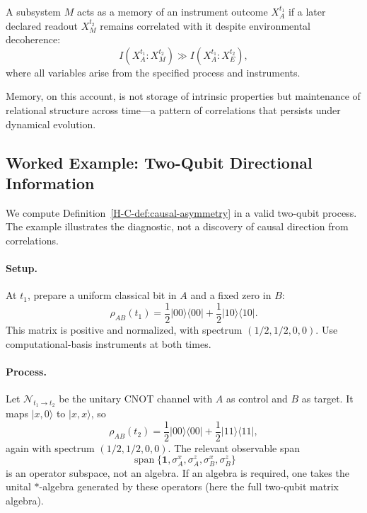 \documentclass[12pt,a4paper,openany]{book}
\begin{document}
A subsystem $M$ acts as a memory of an instrument outcome $X_A^{t_1}$ if a later declared readout $X_M^{t_2}$ remains correlated with it despite environmental decoherence:
\begin{equation}
I(X_A^{t_1}:X_M^{t_2})
\gg I(X_A^{t_1}:X_E^{t_2}),
\end{equation}
where all variables arise from the specified process and instruments.

Memory, on this account, is not storage of intrinsic properties but maintenance of relational structure across time—a pattern of correlations that persists under dynamical evolution.

\subsection{Worked Example: Two-Qubit Directional Information}
\label{H-C-sec:I.5example}

We compute Definition~\ref{H-C-def:causal-asymmetry} in a valid two-qubit process.  The example illustrates the diagnostic, not a discovery of causal direction from correlations.

\paragraph{Setup.}
At $t_1$, prepare a uniform classical bit in $A$ and a fixed zero in $B$:
\begin{equation}
\rho_{AB}(t_1)
=\frac12|00\rangle\langle00|
+\frac12|10\rangle\langle10|.
\end{equation}
This matrix is positive and normalized, with spectrum $(1/2,1/2,0,0)$.  Use computational-basis instruments at both times.

\paragraph{Process.}
Let $\mathcal N_{t_1\to t_2}$ be the unitary CNOT channel with $A$ as control and $B$ as target.  It maps $|x,0\rangle$ to $|x,x\rangle$, so
\begin{equation}
\rho_{AB}(t_2)
=\frac12|00\rangle\langle00|
+\frac12|11\rangle\langle11|,
\end{equation}
again with spectrum $(1/2,1/2,0,0)$.  The relevant observable span
\[
\operatorname{span}\{\mathbf1,\sigma_A^x,\sigma_A^z,
\sigma_B^x,\sigma_B^z\}
\]
is an operator subspace, not an algebra.  If an algebra is required, one takes the unital $*$-algebra generated by these operators (here the full two-qubit matrix algebra).
\end{document}
